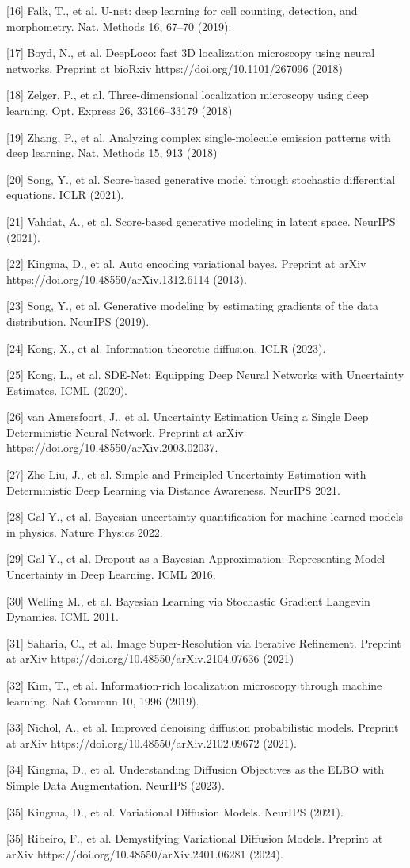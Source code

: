 \documentclass{article}
\begin{document}
{[16] Falk, T., et al. U-net: deep learning for cell counting, detection, and morphometry. Nat. Methods 16, 67–70 (2019).

[17] Boyd, N., et al. DeepLoco: fast 3D localization microscopy using neural networks. Preprint at bioRxiv https://doi.org/10.1101/267096 (2018)

[18] Zelger, P., et al. Three-dimensional localization microscopy using deep learning. Opt. Express 26, 33166–33179 (2018)

[19] Zhang, P., et al. Analyzing complex single-molecule emission patterns with deep learning. Nat. Methods 15, 913 (2018)

[20] Song, Y., et al. Score-based generative model through stochastic differential equations. ICLR (2021). 

[21] Vahdat, A., et al. Score-based generative modeling in latent space. NeurIPS (2021). 

[22] Kingma, D., et al. Auto encoding variational bayes. Preprint at arXiv 
https://doi.org/10.48550/arXiv.1312.6114 (2013). 

[23] Song, Y., et al. Generative modeling by estimating gradients of the data distribution. NeurIPS (2019). 

[24] Kong, X., et al. Information theoretic diffusion. ICLR (2023). 

[25] Kong, L., et al. SDE-Net: Equipping Deep Neural Networks with Uncertainty Estimates. ICML (2020). 

[26] van Amersfoort, J., et al. Uncertainty Estimation Using a Single Deep Deterministic Neural Network. Preprint at arXiv https://doi.org/10.48550/arXiv.2003.02037. 

[27] Zhe Liu, J., et al. Simple and Principled Uncertainty Estimation with
Deterministic Deep Learning via Distance Awareness. NeurIPS 2021. 

[28] Gal Y., et al. Bayesian uncertainty quantification
for machine-learned models in physics. Nature Physics 2022. 

[29] Gal Y., et al. Dropout as a Bayesian Approximation:
Representing Model Uncertainty in Deep Learning. ICML 2016. 

[30] Welling M., et al. Bayesian Learning via Stochastic Gradient Langevin Dynamics. ICML 2011. 

[31] Saharia, C., et al. Image Super-Resolution via Iterative Refinement. Preprint at arXiv https://doi.org/10.48550/arXiv.2104.07636 (2021)

[32] Kim, T., et al. Information-rich localization microscopy through machine learning. Nat Commun 10, 1996 (2019). 

[33] Nichol, A., et al. Improved denoising diffusion probabilistic models. Preprint at arXiv https://doi.org/10.48550/arXiv.2102.09672 (2021). 

[34] Kingma, D., et al. Understanding Diffusion Objectives as the ELBO
with Simple Data Augmentation. NeurIPS (2023). 

[35] Kingma, D., et al. Variational Diffusion Models. NeurIPS (2021). 

[35] Ribeiro, F., et al. Demystifying Variational Diffusion Models.  Preprint at arXiv https://doi.org/10.48550/arXiv.2401.06281 (2024). 

}
\end{document}
